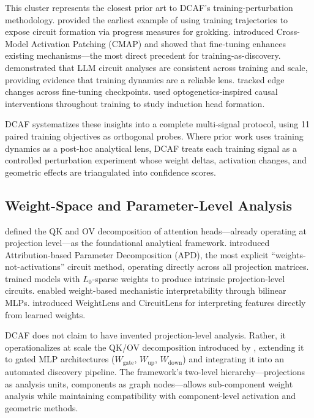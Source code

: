 \documentclass[11pt]{article}
\begin{document}
This cluster represents the closest prior art to DCAF's training-perturbation methodology. \citet{nanda2023grokking} provided the earliest example of using training trajectories to expose circuit formation via progress measures for grokking. \citet{prakash2024finetuning} introduced Cross-Model Activation Patching (CMAP) and showed that fine-tuning enhances existing mechanisms---the most direct precedent for training-as-discovery. \citet{tigges2024consistent} demonstrated that LLM circuit analyses are consistent across training and scale, providing evidence that training dynamics are a reliable lens. \citet{wang2025finetuning} tracked edge changes across fine-tuning checkpoints. \citet{singh2024induction} used optogenetics-inspired causal interventions throughout training to study induction head formation.

DCAF systematizes these insights into a complete multi-signal protocol, using 11 paired training objectives as orthogonal probes. Where prior work uses training dynamics as a post-hoc analytical lens, DCAF treats each training signal as a controlled perturbation experiment whose weight deltas, activation changes, and geometric effects are triangulated into confidence scores.

\subsection{Weight-Space and Parameter-Level Analysis}

\citet{elhage2021mathematical} defined the QK and OV decomposition of attention heads---already operating at projection level---as the foundational analytical framework. \citet{braun2025apd} introduced Attribution-based Parameter Decomposition (APD), the most explicit ``weights-not-activations'' circuit method, operating directly across all projection matrices. \citet{gao2025weightsparse} trained models with $L_0$-sparse weights to produce intrinsic projection-level circuits. \citet{dooms2024bilinear} enabled weight-based mechanistic interpretability through bilinear MLPs. \citet{golimblevskaia2025circuitinsights} introduced WeightLens and CircuitLens for interpreting features directly from learned weights.

DCAF does not claim to have invented projection-level analysis. Rather, it operationalizes at scale the QK/OV decomposition introduced by \citet{elhage2021mathematical}, extending it to gated MLP architectures ($W_{\text{gate}}$, $W_{\text{up}}$, $W_{\text{down}}$) and integrating it into an automated discovery pipeline. The framework's two-level hierarchy---projections as analysis units, components as graph nodes---allows sub-component weight analysis while maintaining compatibility with component-level activation and geometric methods.
\end{document}
